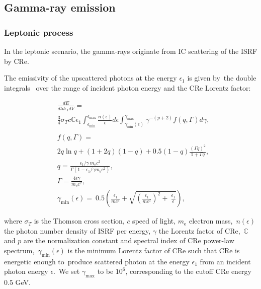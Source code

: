 \documentclass[twocolumn]{aastex631}
\begin{document}
\subsection{Gamma-ray emission}

\subsubsection{Leptonic process}

In the leptonic scenario, the gamma-rays originate from IC scattering of the ISRF by CRe.\

The emissivity of the upscattered photons at the energy $\epsilon_{1}$ is given by\
the double integrals \citep{BLUMENTHAL1970}\
over the range of incident photon energy and the CRe Lorentz factor:

\begin{subequations}
  \begin{align}
  &\frac{dE}{dtd\epsilon_{1}dV} =\nonumber\\
               &\frac{3}{4}\sigma_{T}c\mathbb{C}\epsilon_{1}\int^{\epsilon_{\text{max}}}_{\epsilon_{\text{min}}}
               \frac{n(\epsilon)}{\epsilon}d\epsilon\int^{\gamma_{\text{max}}}_{\gamma_{\text{min}}\left(\epsilon\right)}
               \gamma^{-(p+2)}f(q, \Gamma)d\gamma,\\
  \nonumber\\
  &f(q, \Gamma) =\nonumber\\
               &2q\ln q+(1+2q)(1-q)+0.5(1-q)\frac{\left(\Gamma q\right)^2}{1+\Gamma q},\\
  &q=\frac{\epsilon_{1}/\gamma\
               m_{\text{e}}c^{2}}{\Gamma\left(1-\epsilon_{1}/\gamma m_{\text{e}}c^{2}\right)},\\
  &\Gamma=\frac{4\epsilon \gamma}{m_{\text{e}}c^2},\\
  &\gamma_{\text{min}}(\epsilon)=\
   0.5\left(\frac{\epsilon_{1}}{mc^2}+\sqrt{\left(\frac{\epsilon_{1}}{mc^2}\right)^2+\
   \frac{\epsilon_{1}}{\epsilon}}\right),
  \end{align}
\end{subequations}

where $\sigma_{T}$ is the Thomson cross section, $c$ speed of light, $m_{\text{e}}$ electron mass,\
$n(\epsilon)$ the photon number density of ISRF per energy, $\gamma$ the Lorentz factor of CRe,\
$\mathbb{C}$ and $p$ are the normalization constant and spectral index of CRe power-law spectrum,\
$\gamma_{\text{min}}(\epsilon)$ is the minimum Lorentz factor of CRe such that CRe is energetic enough to\
produce scattered photon at the energy $\epsilon_{1}$ from an incident photon energy $\epsilon$.\
We set $\gamma_{\text{max}}$ to be $10^{6}$, corresponding to the cutoff CRe energy $0.5$ GeV.
\end{document}
